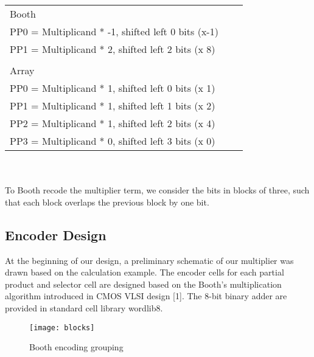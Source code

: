 \documentclass[conference]{IEEEtran}
\begin{document}
\begin{tabular}{ l c r }
Booth&\\
PP0 = Multiplicand * -1, shifted left 0 bits (x-1)​\\
PP1 = Multiplicand * 2, shifted left 2 bits (x 8)​\\
\\
Array&\\
PP0 = Multiplicand * 1, shifted left 0 bits (x 1)​\\
PP1 = Multiplicand * 1, shifted left 1 bits (x 2)​\\
PP2 = Multiplicand * 1, shifted left 2 bits (x 4)​\\
PP3 = Multiplicand * 0, shifted left 3 bits (x 0)\\
\end{tabular}
\\
\\
To Booth recode the multiplier term, we consider the bits in blocks of three, such that each block overlaps the previous block by one bit. 

\subsection{Encoder Design}

At the beginning of our design, a preliminary schematic of our multiplier was drawn based on the calculation example. The encoder cells for each partial product and selector cell are designed based on the Booth’s multiplication algorithm introduced in CMOS VLSI design [1]. The 8-bit binary adder are provided in standard cell library wordlib8. 

%
%
\begin{figure}[!htb]
\centering
\texttt{[image: blocks]}
\caption{Booth encoding grouping}
\label{fig_sim}
\end{figure}
\end{document}

